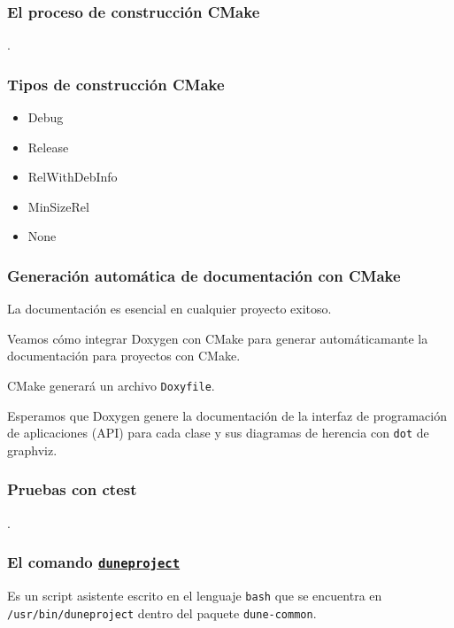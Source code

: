 \begin{frame}[fragile]
	\frametitle{El proceso de construcción CMake}
	.
\end{frame}

\begin{frame}[fragile]
	\frametitle{Tipos de construcción CMake}

	\begin{itemize}
		\item
		
		Debug

		\item
		
		Release

		\item
		
		RelWithDebInfo

		\item
		
		MinSizeRel

		\item
		
		None
	\end{itemize}
\end{frame}

\begin{frame}[fragile]
	\frametitle{Generación automática de documentación con CMake}
	La documentación es esencial en cualquier proyecto exitoso.

	Veamos cómo integrar Doxygen con CMake para generar
	automáticamante la documentación para proyectos con CMake.

	CMake generará un archivo \lstinline{Doxyfile}.

	Esperamos que Doxygen genere la documentación de la interfaz de
	programación de aplicaciones (API) para cada clase y sus
	diagramas de herencia con \lstinline{dot} de graphviz.
\end{frame}

\begin{frame}[fragile]
	\frametitle{Pruebas con ctest}
	.
\end{frame}



\begin{frame}[fragile]
	\frametitle{El comando \href{https://gitlab.dune-project.org/core/dune-common/-/raw/master/bin/duneproject}{\lstinline{duneproject}}}

	Es un script asistente escrito en el lenguaje \lstinline{bash}
	que se encuentra en \lstinline{/usr/bin/duneproject}
	dentro del paquete \lstinline{dune-common}.
\end{frame}


